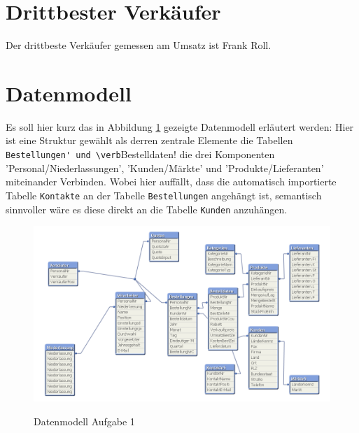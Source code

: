 \documentclass[10pt]{scrartcl}
\begin{document}
\section{Drittbester Verkäufer}
Der drittbeste Verkäufer gemessen am Umsatz ist Frank Roll.

\section{Datenmodell}
Es soll hier kurz das in Abbildung \ref{pic:datenmodell} gezeigte Datenmodell erläutert werden:
Hier ist eine Struktur gewählt als derren zentrale Elemente die Tabellen \verb!Bestellungen' und \verb!Bestelldaten! die drei Komponenten 'Personal/Niederlassungen', 'Kunden/Märkte' und 'Produkte/Lieferanten' miteinander Verbinden.
Wobei hier auffällt, dass die automatisch importierte Tabelle \verb!Kontakte! an der Tabelle \verb!Bestellungen! angehängt ist, semantisch sinnvoller wäre es diese direkt an die Tabelle \verb!Kunden! anzuhängen.
 

\begin{figure}[H]
\begin{turn}{0}	
	\label{pic:datenmodell}
	\includegraphics[scale=0.6]{export.png}
	\caption{Datenmodell Aufgabe 1} 
\end{turn}
\end{figure}
\end{document}
